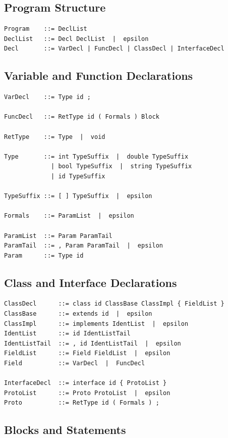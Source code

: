\documentclass[12pt,a4paper]{article}
\begin{document}
\subsection{Program Structure}

\begin{lstlisting}[style=bnf]
Program    ::= DeclList
DeclList   ::= Decl DeclList  |  epsilon
Decl       ::= VarDecl | FuncDecl | ClassDecl | InterfaceDecl
\end{lstlisting}

\subsection{Variable and Function Declarations}

\begin{lstlisting}[style=bnf]
VarDecl    ::= Type id ;

FuncDecl   ::= RetType id ( Formals ) Block

RetType    ::= Type  |  void

Type       ::= int TypeSuffix  |  double TypeSuffix
             | bool TypeSuffix  |  string TypeSuffix
             | id TypeSuffix

TypeSuffix ::= [ ] TypeSuffix  |  epsilon

Formals    ::= ParamList  |  epsilon

ParamList  ::= Param ParamTail
ParamTail  ::= , Param ParamTail  |  epsilon
Param      ::= Type id
\end{lstlisting}

\subsection{Class and Interface Declarations}

\begin{lstlisting}[style=bnf]
ClassDecl      ::= class id ClassBase ClassImpl { FieldList }
ClassBase      ::= extends id  |  epsilon
ClassImpl      ::= implements IdentList  |  epsilon
IdentList      ::= id IdentListTail
IdentListTail  ::= , id IdentListTail  |  epsilon
FieldList      ::= Field FieldList  |  epsilon
Field          ::= VarDecl  |  FuncDecl

InterfaceDecl  ::= interface id { ProtoList }
ProtoList      ::= Proto ProtoList  |  epsilon
Proto          ::= RetType id ( Formals ) ;
\end{lstlisting}

\subsection{Blocks and Statements}
\end{document}
